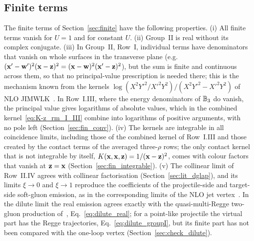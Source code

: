 \subsection{Finite terms}\label{sec:lit_finite}

The finite terms of Section~\ref{sec:finite} have the following properties. (i) All finite terms vanish for $U=1$ and for constant $U$. (ii) Group~II is real without its complex conjugate. (iii) In Group~II, Row~I, individual terms have denominators that vanish on whole surfaces in the transverse plane (e.g.\ $(\mathbf{x}'-\mathbf{w}')^2(\mathbf{x}-\mathbf{z})^2=(\mathbf{x}-\mathbf{w})^2(\mathbf{x}'-\mathbf{z})^2$), but the sum is finite and continuous across them, so that no principal-value prescription is needed there; this is the mechanism known from the kernels $\log(X^2Y'^2/X'^2Y^2)/(X^2Y'^2-X'^2Y^2)$ of NLO JIMWLK~\cite{Balitsky:2013fea,Kovner:2013ona}. In Row~I.III, where the energy denominators of $\mathbb{B}_3$ do vanish, the principal value gives logarithms of absolute values, which in the combined kernel~\eqref{eq:K-z_rm_I_III} combine into logarithms of positive arguments, with no pole left (Section~\ref{sec:fin_conv}). (iv) The kernels are integrable in all coincidence limits, including those of the combined kernel of Row~I.III and those created by the contact terms of the averaged three-$\rho$ rows; the only contact kernel that is not integrable by itself, $K(\mathbf{x},\mathbf{x},\mathbf{z})=1/(\mathbf{x}-\mathbf{z})^2$, comes with colour factors that vanish at $\mathbf{z}=\mathbf{x}$ (Section~\ref{sec:fin_integrable}). (v) The collinear limit of Row~II.IV agrees with collinear factorisation (Section~\ref{sec:lit_dglap}), and its limits $\xi\to0$ and $\xi\to1$ reproduce the coefficients of the projectile-side and target-side soft-gluon emission, as in the corresponding limits of the NLO jet vertex~\cite{Bartels:2006hg}. In the dilute limit the real emission agrees exactly with the quasi-multi-Regge two-gluon production of~\cite{Fadin:1998py,Bartels:2006hg}, Eq.~\eqref{eq:dilute_real}; for a point-like projectile the virtual part has the Regge trajectories, Eq.~\eqref{eq:dilute_groupI}, but its finite part has not been compared with the one-loop vertex (Section~\ref{sec:check_dilute}).

